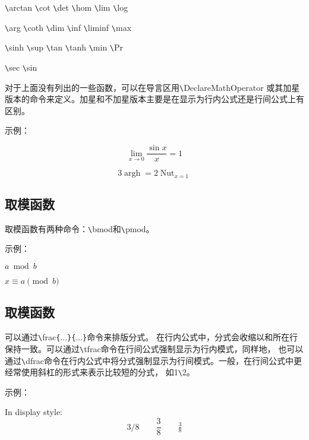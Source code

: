 \documentclass[UTF8]{ctexart}
\DeclareMathOperator{\argh}{argh}
\DeclareMathOperator*{\nut}{Nut}
\begin{document}
\texttt{\textbackslash}arctan \qquad \texttt{\textbackslash}cot \qquad \texttt{\textbackslash}det \qquad \texttt{\textbackslash}hom \qquad \texttt{\textbackslash}lim \qquad \texttt{\textbackslash}log

\texttt{\textbackslash}arg \qquad \texttt{\textbackslash}coth \qquad \texttt{\textbackslash}dim \qquad \texttt{\textbackslash}inf \qquad \texttt{\textbackslash}liminf \qquad \texttt{\textbackslash}max

\texttt{\textbackslash}sinh \qquad \texttt{\textbackslash}sup \qquad \texttt{\textbackslash}tan \qquad \texttt{\textbackslash}tanh \qquad \texttt{\textbackslash}min \qquad \texttt{\textbackslash}Pr

\texttt{\textbackslash}sec \qquad \texttt{\textbackslash}sin

对于上面没有列出的一些函数，可以在导言区用\texttt{\textbackslash}DeclareMathOperator 或其加星版本的命令来定义。加星和不加星版本主要是在显示为行内公式还是行间公式上有区别。

示例：

\begin{equation*}
  \lim_{x \rightarrow 0} \frac{\sin x}{x} = 1
\end{equation*}

\begin{equation*}
  3\argh =2\nut_{x=1}
\end{equation*}

\subsection{取模函数}
取模函数有两种命令：\texttt{\textbackslash}bmod和\texttt{\textbackslash}pmod。

示例：

$a\bmod b$

$x\equiv a \pmod{b}$

\subsection{取模函数}
可以通过\texttt{\textbackslash}frac\texttt{\{}...\texttt{\}}\texttt{\{}...\texttt{\}}命令来排版分式。
在行内公式中，分式会收缩以和所在行保持一致。可以通过\texttt{\textbackslash}tfrac命令在行间公式强制显示为行内模式，同样地，
也可以通过\texttt{\textbackslash}dfrac命令在行内公式中将分式强制显示为行间模式。一般，在行间公式中更经常使用斜杠的形式来表示比较短的分式，
如1\texttt{\textbackslash}2。

示例：

In display style:
\begin{equation*}
  3/8 \qquad \frac{3}{8} \qquad \tfrac{3}{8}
\end{equation*}
\end{document}
